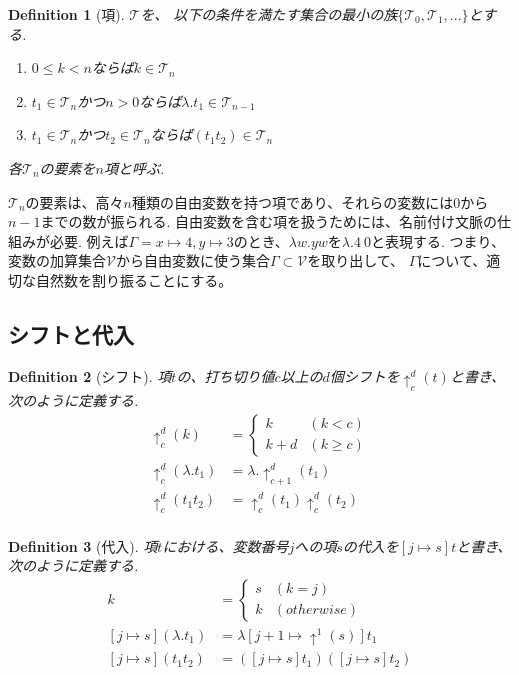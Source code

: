 \documentclass[a4paper,10pt]{article}
\newtheorem{definition}{Definition}[section]
\begin{document}
\begin{definition}[項]
    $\mathcal{T}$を、
    以下の条件を満たす集合の最小の族$\{\mathcal{T}_0, \mathcal{T}_1,...\}$とする.
    \begin{enumerate}
        \item $ 0 \leq k < n$ならば$k \in \mathcal{T}_n$
        \item $t_1 \in \mathcal{T}_n$かつ$n > 0$ならば$\lambda. t_1 \in \mathcal{T}_{n-1}$
        \item $t_1 \in \mathcal{T}_n$かつ$t_2 \in \mathcal{T}_n$ならば$(t_1 t_2) \in \mathcal{T}_n$
    \end{enumerate}
    各$\mathcal{T}_n$の要素を$n$項と呼ぶ.
\end{definition}
$\mathcal{T}_n$の要素は、高々$n$種類の自由変数を持つ項であり、それらの変数には$0$から$n-1$までの数が振られる.
自由変数を含む項を扱うためには、名前付け文脈の仕組みが必要.
例えば$\Gamma = x \mapsto 4, y \mapsto 3$のとき、$\lambda w. y w$を$\lambda. 4\ 0$と表現する.
つまり、変数の加算集合$\mathcal{V}$から自由変数に使う集合$\Gamma \subset \mathcal{V}$を取り出して、
$\Gamma$について、適切な自然数を割り振ることにする。

\subsection*{シフトと代入}
\begin{definition}[シフト]
    項$t$の、打ち切り値$c$以上の$d$個シフトを$\uparrow_{c}^d(t)$と書き、次のように定義する.
    \begin{align*}
        \uparrow_{c}^d(k) &=
        \begin{cases}
            k & (k < c)\\
            k + d & (k \geq c)
        \end{cases}\\
        \uparrow_{c}^d (\lambda. t_1) &= \lambda. \uparrow_{c+1}^d(t_1)\\
        \uparrow_{c}^d (t_1 t_2) &= \uparrow_{c}^d (t_1) \uparrow_c^d(t_2)\\
    \end{align*}
\end{definition}
\begin{definition}[代入]
    項$t$における、変数番号$j$への項$s$の代入を$[j \mapsto s]t$と書き、次のように定義する.
    \begin{align*}
        [j \mapsto s]k &=
        \begin{cases}
            s & (k = j)\\
            k & (otherwise)
        \end{cases}\\
        [j \mapsto s](\lambda. t_1) &= \lambda [j + 1 \mapsto \uparrow^1(s)]t_1\\
        [j \mapsto s](t_1 t_2) &= ([j \mapsto s] t_1)([j \mapsto s] t_2)
    \end{align*}
\end{definition}
\end{document}
